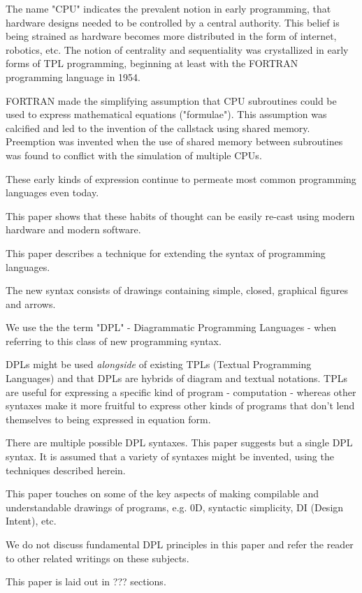 \documentclass[10pt,anonymous,review]{acmart}
\begin{document}
The name "CPU" indicates the prevalent notion in early programming, that
hardware designs needed to be controlled by a central authority. This
belief is being strained as hardware becomes more distributed in the
form of internet, robotics, etc. The notion of centrality and
sequentiality was crystallized in early forms of TPL programming,
beginning at least with the FORTRAN\cite{fortran} programming language in 1954.

FORTRAN made the simplifying assumption that CPU subroutines could be
used to express mathematical equations ("formulae"). This assumption was
calcified and led to the invention of the callstack using shared memory.
Preemption was invented when the use of shared memory between
subroutines was found to conflict with the simulation of multiple CPUs.

These early kinds of expression continue to permeate most common
programming languages even today.

This paper shows that these habits of thought can be easily
re-cast using modern hardware and modern software.

This paper describes a technique for extending the syntax of programming
languages.

The new syntax consists of drawings containing simple, closed, graphical
figures and arrows.

We use the the term "DPL" - Diagrammatic Programming Languages - when
referring to this class of new programming syntax.

DPLs might be used \emph{alongside} of existing TPLs (Textual
Programming Languages) and that DPLs are hybrids of diagram and textual
notations. TPLs are useful for expressing a specific kind of program -
computation - whereas other syntaxes make it more fruitful to express
other kinds of programs that don't lend themselves to being expressed in
equation form.

There are multiple possible DPL syntaxes. This paper suggests but a
single DPL syntax. It is assumed that a variety of syntaxes might be
invented, using the techniques described herein.

This paper touches on some of the key aspects of making compilable and
understandable drawings of programs, e.g. 0D, syntactic simplicity, DI
(Design Intent), etc.

We do not discuss fundamental DPL principles in this paper and refer the
reader to other related writings on these subjects.

This paper is laid out in ??? sections.
\end{document}
